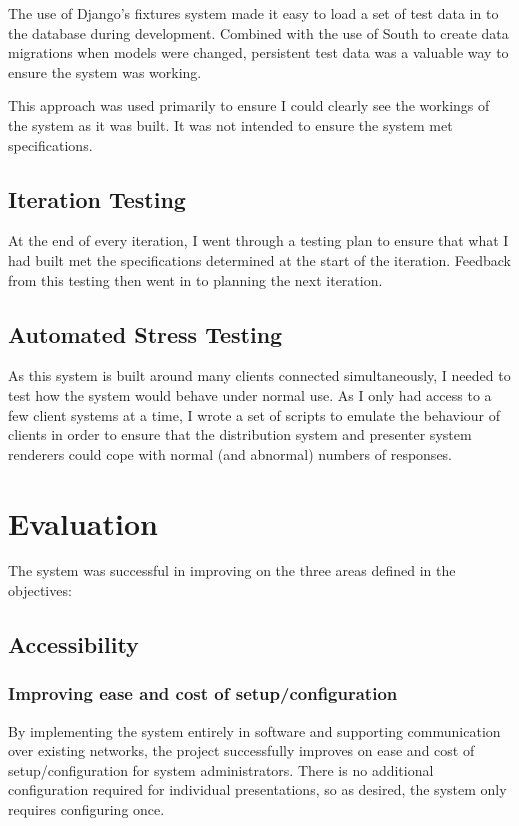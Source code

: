 \documentclass[a4papert,11pt,notitlepage]{ltxdoc}
\begin{document}
The use of Django's fixtures system made it easy to load a set of test data in to the database during development. Combined with the use of South\cite{south:web} to create data migrations when models were changed, persistent test data was a valuable way to ensure the system was working.

This approach was used primarily to ensure I could clearly see the workings of the system as it was built. It was not intended to ensure the system met specifications.


\subsection{Iteration Testing}
At the end of every iteration, I went through a testing plan to ensure that what I had built met the specifications determined at the start of the iteration. Feedback from this testing then went in to planning the next iteration.


\subsection{Automated Stress Testing}
As this system is built around many clients connected simultaneously, I needed to test how the system would behave under normal use. As I only had access to a few client systems at a time, I wrote a set of scripts to emulate the behaviour of clients in order to ensure that the distribution system and presenter system renderers could cope with normal (and abnormal) numbers of responses.

\pagebreak
\section{Evaluation}
The system was successful in improving on the three areas defined in the objectives:

\subsection{Accessibility}
\subsubsection{Improving ease and cost of setup/configuration}
By implementing the system entirely in software and supporting communication over existing networks, the project successfully improves on ease and cost of setup/configuration for system administrators. There is no additional configuration required for individual presentations, so as desired, the system only requires configuring once.
\end{document}
